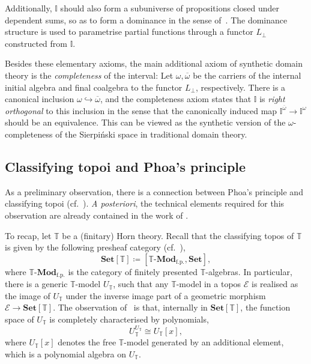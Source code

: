 \documentclass[12pt]{amsart}
\theoremstyle{definition}
\newcommand{\mc}[1]{\mathcal{#1}}
\newcommand{\mb}[1]{\mathbf{#1}}
\newcommand{\mbb}[1]{\mathbb{#1}}
\newcommand{\T}{\mbb T}
\newcommand{\I}{\mbb I}
\newcommand{\mr}[1]{\mathrm{#1}}
\newcommand{\Set}{\mb{Set}}
\newcommand{\ov}[1]{\overline{#1}}
\newcommand{\hook}{\hookrightarrow}
\newcommand{\fp}{_{\mr{f.p.}}}
\newcommand{\prt}{_{\bot}}
\newcommand{\mmod}[1]{#1\text{-}\mathbf{Mod}}
\begin{document}
Additionally, $\I$ should also form a subuniverse of propositions closed under dependent sums, so as to form a dominance in the sense of~\cite{rosolini1986continuity}. The dominance structure is used to parametrise partial functions through a functor $L\prt$ constructed from $\I$. 

Besides these elementary axioms, the main additional axiom of synthetic domain theory is the \emph{completeness} of the interval: Let $\omega,\ov\omega$ be the carriers of the internal initial algebra and final coalgebra to the functor $L\prt$, respectively. 
There is a canonical inclusion $\omega \hook \ov\omega$, and the completeness axiom states that $\I$ is \emph{right orthogonal} to this inclusion in the sense that the canonically induced map $\I^{\ov\omega} \to \I^{\omega}$ should be an equivalence. This can be viewed as the synthetic version of the $\omega$-completeness of the Sierpi\'nski space in traditional domain theory.

\subsection{Classifying topoi and Phoa's principle}\label{subsec:classtopphoa}

As a preliminary observation, there is a connection between Phoa's principle and classifying topoi (cf.~\cite[Lem 3.8]{gratzer2024directed}).
\emph{A posteriori}, the technical elements required for this observation are already contained in the work of \citet{RN879}.

To recap, let $\T$ be a (finitary) Horn theory. Recall that the classifying topos of $\T$ is given by the following presheaf category (cf.~\cite[D3.1]{johnstone2002sketches}),
\[ \Set[\T] \coloneq [\mmod\T\fp,\Set], \]
where $\mmod\T\fp$ is the category of finitely presented $\T$-algebras. In particular, there is a generic $\T$-model $U_\T$, such that any $\T$-model in a topos $\mc E$ is realised as the image of $U_\T$ under the inverse image part of a geometric morphism $\mc E \to \Set[\T]$. The observation of~\cite{RN879} is that, internally in $\Set[\T]$, the function space of $U_\T$ is completely characterised by polynomials,
\[ U_\T^{U_\T} \cong U_\T[x], \]
where $U_\T[x]$ denotes the free $\T$-model generated by an additional element, which is a  polynomial algebra on $U_\T$.
\end{document}
